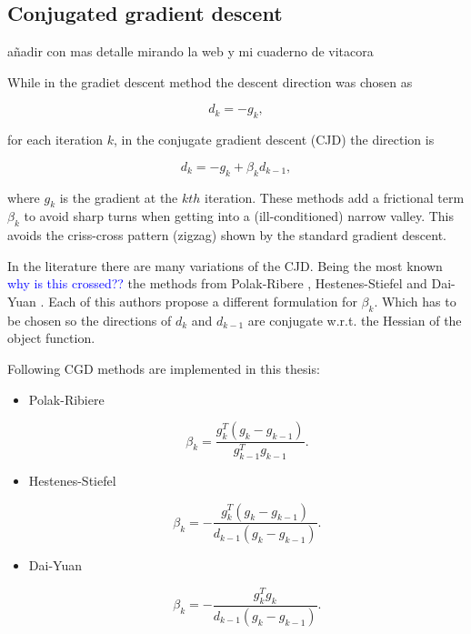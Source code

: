 \subsection{Conjugated gradient descent}
\label{subsec:CJD}

{\color{red} añadir con mas detalle mirando la web y mi cuaderno de vitacora} 


While in the gradiet descent method the descent direction was chosen as 

\begin{equation}
d_k = -g_k ,
\end{equation} 

for each iteration $k$, in the conjugate gradient descent (CJD) the direction is

\begin{equation}
d_k = -g_k + \beta_k d_{k-1},
\end{equation}

where $g_k$ is the gradient at the $kth$ iteration. These methods add a frictional term $\beta_k$ to avoid sharp turns when getting into a (ill-conditioned) narrow valley. This avoids the criss-cross pattern (zigzag) shown by the standard gradient descent.

In the literature there are many variations of the CJD. Being the most known \textcolor{blue}{why is this crossed?? } the methods from Polak-Ribere \cite{polak},  Hestenes-Stiefel \cite{hestenes} and Dai-Yuan \cite{dai}. Each of this authors propose a different formulation for $\beta_k$. Which has to be chosen so the directions of $d_{k}$ and $d_{k-1}$ are conjugate w.r.t. the Hessian of the object function.

Following CGD methods are implemented in this thesis:

\begin{itemize}
	\item Polak-Ribiere
	
	\begin{equation}
	\beta_k = \frac{ g_k^{T} (g_k - g_{k-1})}{ g_{k-1}^{T} g_{k-1}}	.
	\end{equation}
	
	\item Hestenes-Stiefel
	
	\begin{equation}
	\beta_k = - \frac{ g_k^{T} (g_k - g_{k-1})}{d_{k-1} (g_k - g_{k-1})}	.
	\end{equation}	
	
	\item Dai-Yuan
	
	\begin{equation}
	\beta_k =- \frac{ g_k^{T} g_k }{d_{k-1} (g_k - g_{k-1})}		.
	\end{equation}
	
	
\end{itemize}





